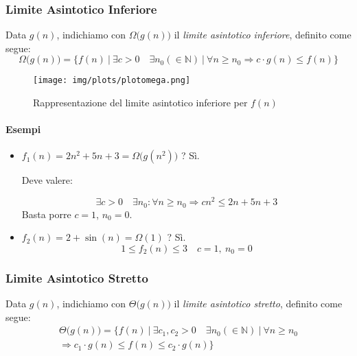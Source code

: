 \newpage
\subsubsection{Limite Asintotico Inferiore}
Data $g(n)$, indichiamo con $\Omega \big(g(n) \big)$ il \emph{limite asintotico inferiore}, definito come segue:
\begin{displaymath}
	\Omega \big(g(n) \big) = \{ f(n) \ \vert \ \exists c > 0 \quad \exists n_0 (\in \mathbb{N}) \ \vert \ \forall n \geq n_0 \Rightarrow c \cdot g(n) \leq f(n) \}
\end{displaymath}

\begin{figure}[!htb]
	\centering
	\texttt{[image: img/plots/plotomega.png]}
	\caption{Rappresentazione del limite asintotico inferiore per $f(n)$}
\end{figure}

\paragraph{Esempi}
\begin{itemize}
	\item $f_1(n) = 2n^2 + 5n + 3 = \Omega \big(g(n^2) \big)$ ? Sì.\par
	Deve valere: \par
	\begin{displaymath}
		\exists c > 0 \quad \exists n_0 : \forall n \geq n_0 \Rightarrow cn^2 \leq 2n + 5n + 3
	\end{displaymath}
	Basta porre $c = 1$, $n_0 = 0$.
	
	\item $f_2(n) = 2 + \sin (n) = \Omega (1)$ ? Sì.
	\begin{displaymath}
		1 \leq f_2(n) \leq 3 \quad c = 1, \ n_0 = 0
	\end{displaymath}
\end{itemize}

\subsubsection{Limite Asintotico Stretto}
Data $g(n)$, indichiamo con $\Theta \big( g(n) \big)$ il \emph{limite asintotico stretto}, definito come segue:
\begin{multline*}
	\Theta \big( g(n) \big) = \{ f(n) \ \vert \ \exists c_1, c_2 > 0 \quad \exists n_0 (\in \mathbb{N}) \ \vert \ \forall n \geq n_0 \\ 
	\Rightarrow c_1 \cdot g(n) \leq f(n) \leq c_2 \cdot g(n) \}
\end{multline*}

